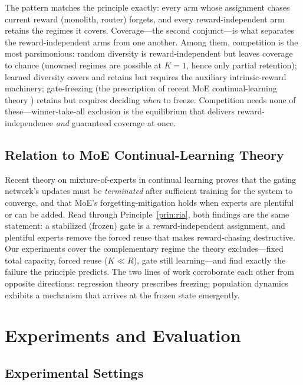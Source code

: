 \documentclass[10pt]{article}
\begin{document}
The pattern matches the principle exactly: every arm whose assignment chases current
reward (monolith, router) forgets, and every reward-independent arm retains the
regimes it covers. Coverage---the second conjunct---is what separates the
reward-independent arms from one another. Among them, competition is the most
parsimonious: random diversity is reward-independent but leaves coverage to chance
(unowned regimes are possible at $K=1$, hence only partial retention); learned
diversity covers and retains but requires the auxiliary intrinsic-reward machinery;
gate-freezing (the prescription of recent MoE continual-learning theory
\cite{li2024moecl}) retains but requires deciding \emph{when} to freeze. Competition
needs none of these---winner-take-all exclusion is the equilibrium that delivers
reward-independence \emph{and} guaranteed coverage at once.

\subsection{Relation to MoE Continual-Learning Theory}

Recent theory on mixture-of-experts in continual learning \cite{li2024moecl}
proves that the gating
network's updates must be \emph{terminated} after sufficient training for the
system to converge, and that MoE's forgetting-mitigation holds when experts are
plentiful or can be added. Read through Principle~\ref{prin:ria}, both findings
are the same statement: a stabilized (frozen) gate is a reward-independent
assignment, and plentiful experts remove the forced reuse that makes
reward-chasing destructive. Our experiments cover the complementary regime the
theory excludes---fixed total capacity, forced reuse ($K \ll R$), gate still
learning---and find exactly the failure the principle predicts. The two lines of
work corroborate each other from opposite directions: regression theory
prescribes freezing; population dynamics exhibits a mechanism that arrives at
the frozen state emergently.

\section{Experiments and Evaluation}
\label{sec:experiments}

\subsection{Experimental Settings}
\end{document}
